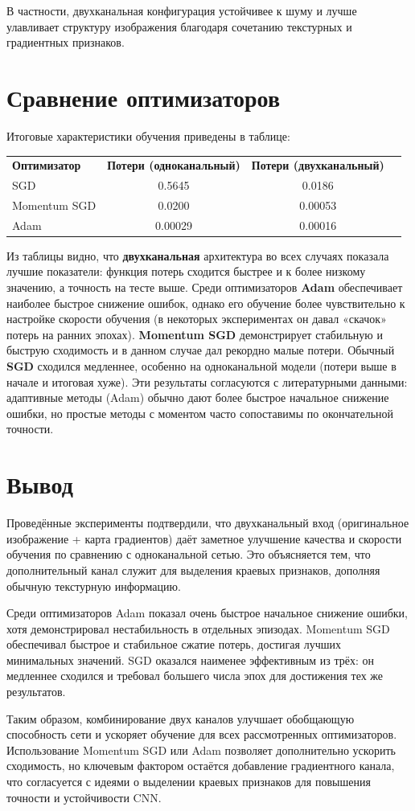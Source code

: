 \documentclass[14pt,a4paper]{extarticle}
\begin{document}
В частности, двухканальная конфигурация устойчивее к шуму и лучше улавливает структуру изображения благодаря сочетанию текстурных и градиентных признаков.

\section{Сравнение оптимизаторов}

Итоговые характеристики обучения приведены в таблице:

\begin{tabular}{l|c|c|c}
\textbf{Оптимизатор} & \textbf{Потери (одноканальный)} & \textbf{Потери (двухканальный)} \\
SGD & 0.5645 & 0.0186 \\
Momentum SGD & 0.0200 & 0.00053 \\
Adam & 0.00029 & 0.00016 \\
\end{tabular}

Из таблицы видно, что \textbf{двухканальная} архитектура во всех случаях показала лучшие показатели: функция потерь сходится быстрее и к более низкому значению, а точность на тесте выше. Среди оптимизаторов \textbf{Adam} обеспечивает наиболее быстрое снижение ошибок, однако его обучение более чувствительно к настройке скорости обучения (в некоторых экспериментах он давал «скачок» потерь на ранних эпохах). \textbf{Momentum SGD} демонстрирует стабильную и быструю сходимость и в данном случае дал рекордно малые потери. Обычный \textbf{SGD} сходился медленнее, особенно на одноканальной модели (потери выше в начале и итоговая хуже). Эти результаты согласуются с литературными данными: адаптивные методы (Adam) обычно дают более быстрое начальное снижение ошибки, но простые методы с моментом часто сопоставимы по окончательной точности.

\section{Вывод}

Проведённые эксперименты подтвердили, что двухканальный вход (оригинальное изображение + карта градиентов) даёт заметное улучшение качества и скорости обучения по сравнению с одноканальной сетью. Это объясняется тем, что дополнительный канал служит для выделения краевых признаков, дополняя обычную текстурную информацию.

Среди оптимизаторов Adam показал очень быстрое начальное снижение ошибки, хотя демонстрировал нестабильность в отдельных эпизодах. Momentum SGD обеспечивал быстрое и стабильное сжатие потерь, достигая лучших минимальных значений. SGD оказался наименее эффективным из трёх: он медленнее сходился и требовал большего числа эпох для достижения тех же результатов.

Таким образом, комбинирование двух каналов улучшает обобщающую способность сети и ускоряет обучение для всех рассмотренных оптимизаторов. Использование Momentum SGD или Adam позволяет дополнительно ускорить сходимость, но ключевым фактором остаётся добавление градиентного канала, что согласуется с идеями о выделении краевых признаков для повышения точности и устойчивости CNN.
\end{document}
